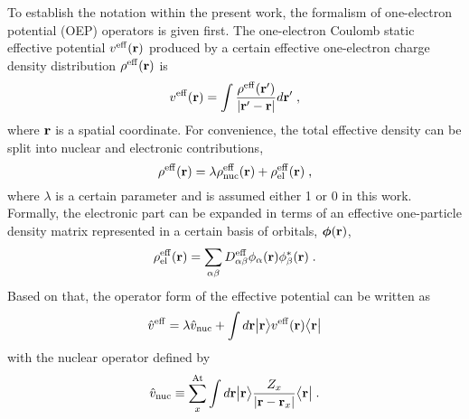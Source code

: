To establish the notation within the present work, 
the formalism of one\hyp{}electron potential (OEP) operators is
given first.
The one\hyp{}electron Coulomb static effective potential $v^{\rm eff}({\bf r})$
produced by a certain effective one\hyp{}electron charge density distribution $\rho^{\rm eff}({\bf r})$
is 
%
\begin{equation} \label{e:v-eff}
	v^{\rm eff}({\bf r}) = \int \frac{ \rho^{\rm eff}({\bf r}') }{ \vert {\bf r}' - {\bf r} \vert} d{\bf r}' \;,
\end{equation}
%
where ${\bf r}$ is a spatial coordinate. 
For convenience, the total effective density can be split into nuclear and electronic contributions,
%
\begin{equation} \label{e:rho-eff}
 \rho^{\rm eff}({\bf r}) = \lambda \rho^{\rm eff}_{\rm nuc}({\bf r}) + \rho^{\rm eff}_{\rm el}({\bf r}) \;,
\end{equation}
%
where $\lambda$ is a certain parameter and is assumed either 1 or 0 in this work.
Formally, the electronic part can be expanded in terms of an effective
one\hyp{}particle density matrix represented in a certain basis of orbitals, $\BM{\phi}({\bf r})$,
%
\begin{equation} \label{e:d-spectral}
	\rho^{\rm eff}_{\rm el}({\bf r}) = \sum_{\alpha\beta} D_{\alpha\beta}^{\rm eff} 
	\phi_\alpha({\bf r}) \phi_\beta^{*}({\bf r})  \;.
\end{equation}
%
Based on that, the operator form of the effective potential 
can be written as
%
\begin{equation} \label{e:oep-operator}
	\hat{v}^{\rm eff} = 
        \lambda \hat{v}_{\rm nuc} +
        \int d{\bf r} \Ket{{\bf r}} 
        v^{\rm eff}({\bf r})
        \Bra{{\bf r}}
\end{equation}
%
with the nuclear
operator
defined by
%
\begin{equation}
        \hat{v}_{\rm nuc} \equiv \sum_x^{\rm At}  
                     \int d{\bf r} \Ket{{\bf r}} 
                     \frac{Z_x}{\vert {\bf r} - {\bf r}_x \vert}
                     \Bra{{\bf r}} \;.
\end{equation}
